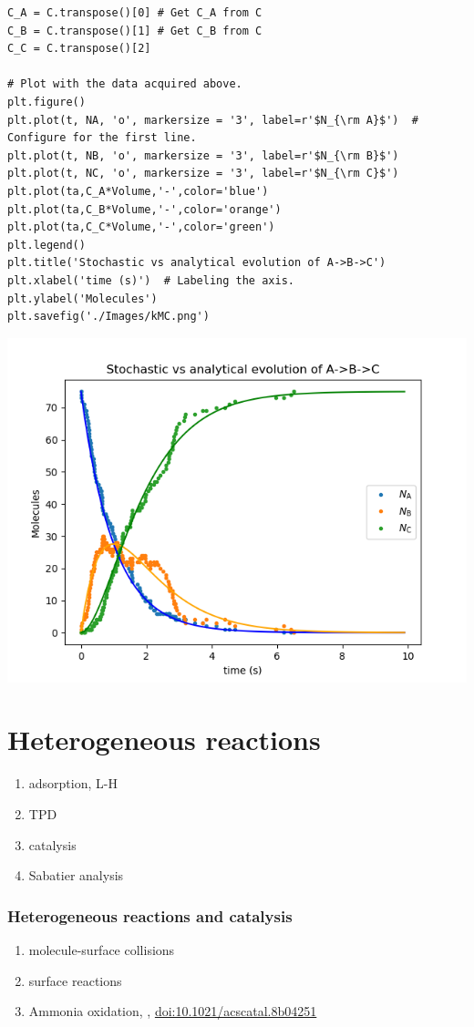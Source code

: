 \documentclass[11pt]{article}
\begin{document}
\begin{verbatim}
C_A = C.transpose()[0] # Get C_A from C
C_B = C.transpose()[1] # Get C_B from C
C_C = C.transpose()[2]

# Plot with the data acquired above.
plt.figure()
plt.plot(t, NA, 'o', markersize = '3', label=r'$N_{\rm A}$')  # Configure for the first line.
plt.plot(t, NB, 'o', markersize = '3', label=r'$N_{\rm B}$')
plt.plot(t, NC, 'o', markersize = '3', label=r'$N_{\rm C}$')
plt.plot(ta,C_A*Volume,'-',color='blue')
plt.plot(ta,C_B*Volume,'-',color='orange')
plt.plot(ta,C_C*Volume,'-',color='green')
plt.legend()
plt.title('Stochastic vs analytical evolution of A->B->C')
plt.xlabel('time (s)')  # Labeling the axis.
plt.ylabel('Molecules')
plt.savefig('./Images/kMC.png')
\end{verbatim}

\begin{center}
\includegraphics[width=.9\linewidth]{./Images/kMC.png}
\end{center}




\section{Heterogeneous reactions}
\label{sec:org7f89e14}
\begin{enumerate}
\item adsorption, L-H
\item TPD
\item catalysis
\item Sabatier analysis
\end{enumerate}
\subsubsection{Heterogeneous reactions and catalysis}
\label{sec:orgcaa5d04}
\begin{enumerate}
\item molecule-surface collisions
\item surface reactions
\item Ammonia oxidation, , \href{http://pubs.acs.org/doi/10.1021/acscatal.8b04251}{doi:10.1021/acscatal.8b04251}
\end{enumerate}
\end{document}
